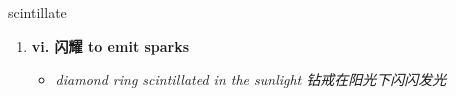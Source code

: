 
\begin{frame}
{\huge scintillate}
\begin{center}
\begin{enumerate}\Large
  \item \textbf{vi. 闪耀  to emit sparks}
  \begin{itemize}
    \item \em{\Large{diamond ring scintillated in the sunlight 钻戒在阳光下闪闪发光}}
  \end{itemize}
\end{enumerate}
\end{center}
\end{frame}
